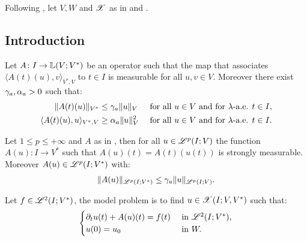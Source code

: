 Following \cite[p.~124]{Ern2021}, let $V, W$ and $\mathscr{X}$ as in  and .

\subsection{Introduction}

\begin{definition}[$A$] \label{definition:A} %
    Let $A \colon I \rightarrow \mathbb{L}(V;V^*)$ be an operator such that the map that associates $\langle A(t)(u), v \rangle_{V^*, V}$ to $t \in I$ is measurable for all $u, v \in V$. Moreover there exist $\gamma_{a}, \alpha_{a} > 0$ such that:
    \begin{align} \label{equation:a}
        \lVert A(t)(u) \rVert_{V^*} & \leq \gamma_{a} \lVert u \rVert_V &\text{ for all } u \in V \text{ and for } \lambda \text{-a.e. } t \in I, \\
        \langle A(t)(u), u \rangle_{V^*, V} & \geq \alpha_{a} \lVert u \rVert_V^2 &\text{ for all } u \in V \text{ and for } \lambda \text{-a.e. } t \in I.
    \end{align}
\end{definition}

\begin{lemma}
    Let $1 \leq p \leq +\infty$ and  $A$ as in , then for all $u \in \mathscr{L}^{p}(I; V)$ the function $A(u) \colon I \rightarrow V^*$ such that $A(u)(t) = A(t)(u(t))$ is strongly measurable. Moreover $A(u) \in \mathscr{L}^{p}(I; V^*)$ with:
    \begin{align}
        \lVert A(u) \rVert_{\mathscr{L}^{p}(I; V^*)} \leq \gamma_{a} \lVert u \rVert_{\mathscr{L}^{p}(I; V)}.
    \end{align}
\end{lemma}

\begin{definition}
    Let $f \in \mathscr{L}^{2}(I; V^*)$, the model problem is to find $u \in \mathscr{X}(I; V, V^*)$ such that:
    \begin{align}
        \begin{cases} \label{equation:model}
            \partial_t u(t) + A(u)(t) = f(t) & \text{ in } \mathscr{L}^{2}(I; V^*), \\
            u(0) = u_0 & \text{ in } W.
        \end{cases}
    \end{align}
\end{definition}

